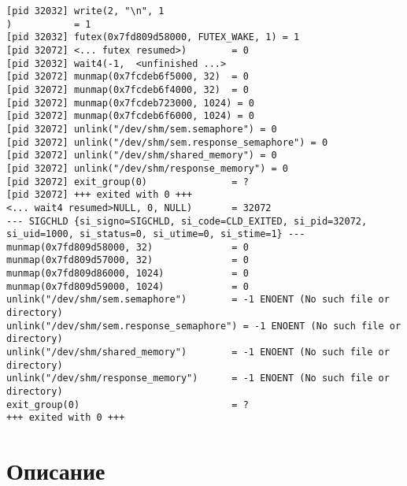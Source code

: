 \documentclass[a4paper, 14pt]{article}
\begin{document}
\begin{lstlisting}
[pid 32032] write(2, "\n", 1
)           = 1
[pid 32032] futex(0x7fd809d58000, FUTEX_WAKE, 1) = 1
[pid 32072] <... futex resumed>)        = 0
[pid 32032] wait4(-1,  <unfinished ...>
[pid 32072] munmap(0x7fcdeb6f5000, 32)  = 0
[pid 32072] munmap(0x7fcdeb6f4000, 32)  = 0
[pid 32072] munmap(0x7fcdeb723000, 1024) = 0
[pid 32072] munmap(0x7fcdeb6f6000, 1024) = 0
[pid 32072] unlink("/dev/shm/sem.semaphore") = 0
[pid 32072] unlink("/dev/shm/sem.response_semaphore") = 0
[pid 32072] unlink("/dev/shm/shared_memory") = 0
[pid 32072] unlink("/dev/shm/response_memory") = 0
[pid 32072] exit_group(0)               = ?
[pid 32072] +++ exited with 0 +++
<... wait4 resumed>NULL, 0, NULL)       = 32072
--- SIGCHLD {si_signo=SIGCHLD, si_code=CLD_EXITED, si_pid=32072, si_uid=1000, si_status=0, si_utime=0, si_stime=1} ---
munmap(0x7fd809d58000, 32)              = 0
munmap(0x7fd809d57000, 32)              = 0
munmap(0x7fd809d86000, 1024)            = 0
munmap(0x7fd809d59000, 1024)            = 0
unlink("/dev/shm/sem.semaphore")        = -1 ENOENT (No such file or directory)
unlink("/dev/shm/sem.response_semaphore") = -1 ENOENT (No such file or directory)
unlink("/dev/shm/shared_memory")        = -1 ENOENT (No such file or directory)
unlink("/dev/shm/response_memory")      = -1 ENOENT (No such file or directory)
exit_group(0)                           = ?
+++ exited with 0 +++
\end{lstlisting}

\section*{Описание}
\end{document}
